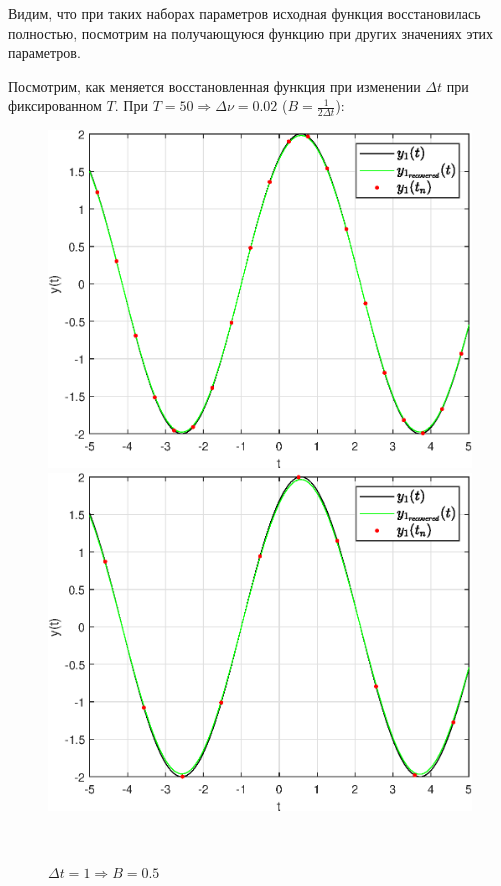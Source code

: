 \documentclass[a4paper]{article}
\begin{document}
Видим, что при таких наборах параметров исходная функция восстановилась полностью, посмотрим на получающуюся функцию при других значениях этих параметров. 

Посмотрим, как меняется восстановленная функция при изменении $\Delta t$ при фиксированном $T$. При $T = 50 \Rightarrow \Delta \nu = 0.02$ ($B=\frac{1}{2\Delta t}$):

\begin{figure}[H]
    \begin{minipage}{0.5\textwidth}
        \centering \includegraphics[width=\textwidth]{graphs2/T_50_dt_0.5_B_1_dv_0.02/func1_recovered.eps}
        \caption{$\Delta t = 0.5 \Rightarrow B = 1$}
    \end{minipage}\hfill
    \begin{minipage}{0.5\textwidth}
        \centering \includegraphics[width=\textwidth]{graphs2/T_50_dt_1_B_0.5_dv_0.02/func1_recovered.eps}
        \caption{$\Delta t = 1 \Rightarrow B = 0.5$}
    \end{minipage}\\[1em]
\end{figure}\noindent\
\end{document}

